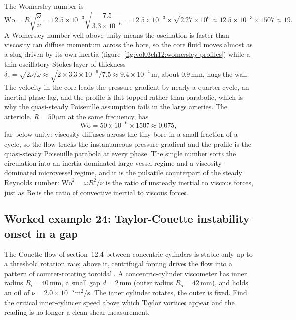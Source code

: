 The Womersley number is
\[
\text{Wo} = R\sqrt{\frac{\omega}{\nu}} = 12.5\times10^{-3}\sqrt{
\frac{7.5}{3.3\times10^{-6}}} = 12.5\times10^{-3}\times\sqrt{2.27
\times10^{6}} \approx 12.5\times10^{-3}\times1507 \approx 19.
\]
A Womersley number well above unity means the oscillation is faster
than viscosity can diffuse momentum across the bore, so the core fluid
moves almost as a slug driven by its own inertia
(figure~\ref{fig:vol03ch12:womersley-profiles}) while a thin
oscillatory Stokes layer of thickness $\delta_s = \sqrt{2\nu/\omega}
\approx \sqrt{2\times3.3\times10^{-6}/7.5} \approx 9.4\times10^{-4}\,
\si{\meter}$, about $0.9\,\si{\milli\meter}$, hugs the wall. The
velocity in the core leads the pressure gradient by nearly a quarter
cycle, an inertial phase lag, and the profile is flat-topped rather
than parabolic, which is why the quasi-steady Poiseuille assumption
fails in the large arteries. The arteriole, $R = 50\,\si{\micro
\meter}$ at the same frequency, has
\[
\text{Wo} = 50\times10^{-6}\times1507 \approx 0.075,
\]
far below unity: viscosity diffuses across the tiny bore in a small
fraction of a cycle, so the flow tracks the instantaneous pressure
gradient and the profile is the quasi-steady Poiseuille parabola at
every phase. The single number sorts the circulation into an
inertia-dominated large-vessel regime and a viscosity-dominated
microvessel regime, and it is the pulsatile counterpart of the steady
Reynolds number: $\text{Wo}^2 = \omega R^2/\nu$ is the ratio of
unsteady inertial to viscous forces, just as $\text{Re}$ is the ratio
of convective inertial to viscous forces.



\subsection*{Worked example 24: Taylor-Couette instability onset in a gap}

The Couette flow of section~12.4 between concentric cylinders is stable
only up to a threshold rotation rate; above it, centrifugal forcing
drives the flow into a pattern of counter-rotating toroidal
. A concentric-cylinder viscometer has inner
radius $R_i = 40\,\si{\milli\meter}$, a small gap $d = 2\,\si{\milli
\meter}$ (outer radius $R_o = 42\,\si{\milli\meter}$), and holds an oil
of $\nu = 2.0\times10^{-5}\,\si{\meter}^2/\si{\second}$. The inner
cylinder rotates, the outer is fixed. Find the critical inner-cylinder
speed above which Taylor vortices appear and the reading is no longer a
clean shear measurement.

